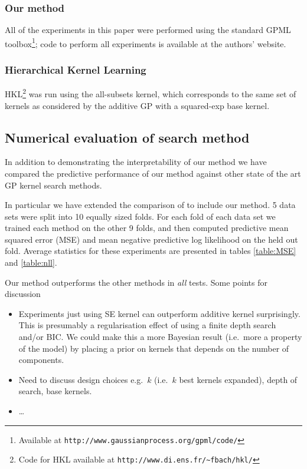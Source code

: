 \documentclass[twoside]{article}
\theoremstyle{definition}
\theoremstyle{remark}
\numberwithin{equation}{section}
\numberwithin{thm}{section}
\begin{document}
\subsubsection{Our method}
All of the experiments in this paper were performed using the standard GPML toolbox\footnote{Available at \texttt{http://www.gaussianprocess.org/gpml/code/}}; code to perform all experiments is available at the authors' website.

\subsubsection{Hierarchical Kernel Learning}	
HKL\footnote{Code for HKL available at \texttt{http://www.di.ens.fr/\textasciitilde fbach/hkl/}} was run using the all-subsets kernel, which corresponds to the same set of kernels as considered by the additive GP with a squared-exp base kernel.







\subsection{Numerical evaluation of search method}

In addition to demonstrating the interpretability of our method we have compared the predictive performance of our method against other state of the art GP kernel search methods.

In particular we have extended the comparison of \cite{duvenaud2011additive11} to include our method.
5 data sets were split into 10 equally sized folds.
For each fold of each data set we trained each method on the other 9 folds, and then computed predictive mean squared error (MSE) and mean negative predictive log likelihood on the held out fold.
Average statistics for these experiments are presented in tables \ref{table:MSE} and \ref{table:nll}.




Our method outperforms the other methods in \emph{all} tests.
Some points for discussion
\begin{itemize}
\item Experiments just using SE kernel can outperform additive kernel surprisingly. This is presumably a regularisation effect of using a finite depth search and/or BIC. We could make this a more Bayesian result (i.e.~more a property of the model) by placing a prior on kernels that depends on the number of components.
\item Need to discuss design choices e.g.~$k$ (i.e.~$k$ best kernels expanded), depth of search, base kernels.
\item \ldots
\end{itemize}
\end{document}
